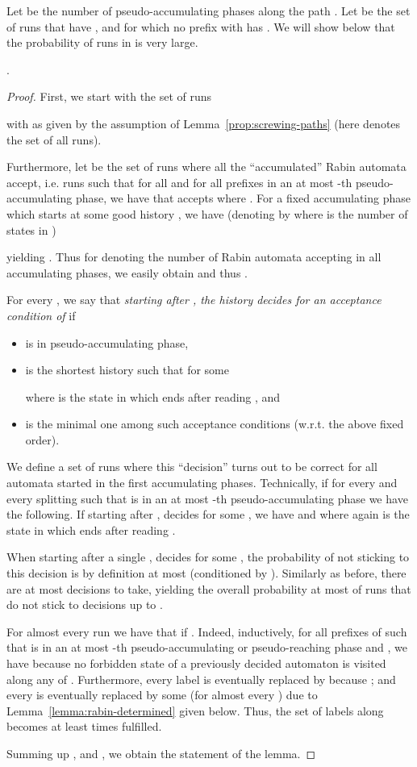 \documentclass[a4paper,UKenglish]{lipics}
\begin{document}
Let  be the number of pseudo-accumulating phases along the path  . Let
 be the set of runs  that have , and for which no prefix  with  has .
We will show below that the probability of runs in  is very large. 

\begin{lemma}\label{lemma:alternating-runs}
	. 
\end{lemma}
\begin{proof} 
	First, we start with the set of runs
	
	with  as given by the assumption of Lemma~\ref{prop:screwing-paths} (here  denotes the set of all runs).
	
	Furthermore, let  be the set of runs where all the ``accumulated'' Rabin automata accept, i.e. runs  such that for all  and for all prefixes  in an at most -th pseudo-accumulating phase, we have that  accepts  where .
For a fixed accumulating phase which starts at some good history , we have (denoting  by  where  is the number of states in )
	
	yielding . Thus for  denoting the number of Rabin automata accepting in all  accumulating phases, we easily obtain  and thus .
	
	For every , we say that \emph{starting after , the history  decides for an acceptance condition  of } if
	\begin{itemize}
		\item  is in pseudo-accumulating phase, 
		\item  is the shortest history such that for some  
		
		where  is the state in which  ends after reading , and
		\item  is the minimal one among such acceptance conditions  (w.r.t. the above fixed order).
	\end{itemize}   
	
	We define a set  of runs where this ``decision'' turns out to be correct for all automata started in the first  accumulating phases. Technically,  if for every  and every splitting  such that  is in an at most -th pseudo-accumulating phase we have the following. If starting after ,  decides for some , we have  and  where again  is the state in which  ends after reading . 
	
	When starting after a single ,  decides for some , the probability of not sticking to this decision is by definition at most  (conditioned by ). Similarly as before, there are at most  decisions to take, yielding the overall probability at most  of runs that do not stick to decisions up to .
	
	For almost every run  we have that  if . Indeed, inductively, for all prefixes  of  such that  is in an at most -th pseudo-accumulating or pseudo-reaching phase and , we have  because no forbidden state  of a previously decided automaton is visited along any  of . Furthermore, every label  is eventually replaced by  because ; and every  is eventually replaced by some  (for almost every ) due to Lemma~\ref{lemma:rabin-determined} given below. Thus, the set of labels along  becomes at least  times fulfilled.
	
	Summing up ,  and , we obtain the statement of the lemma.
\end{proof}
\end{document}
